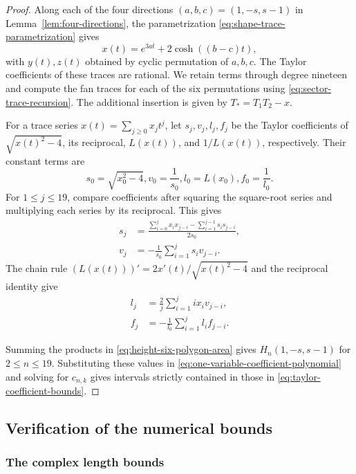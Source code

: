 \documentclass[10pt,twoside]{article}
\theoremstyle{plain}
\theoremstyle{definition}
\theoremstyle{remark}
\begin{document}
\begin{proof}
Along each of the four directions $(a,b,c)=(1,-s,s-1)$ in
Lemma~\ref{lem:four-directions}, the parametrization
\eqref{eq:shape-trace-parametrization} gives
$$
x(t)=e^{3at}+2\cosh((b-c)t),
$$
with $y(t),z(t)$ obtained by cyclic permutation of $a,b,c$.
The Taylor coefficients of these traces are rational. We retain
terms through degree nineteen and compute the fan traces for each
of the six permutations using \eqref{eq:sector-trace-recursion}.
The additional insertion is given by $T_*=T_1T_2-x$.

For a trace series $x(t)=\sum_{j\geq0}x_jt^j$, let
$s_j,v_j,l_j,f_j$ be the Taylor coefficients of
$\sqrt{x(t)^2-4}$, its reciprocal, $L(x(t))$, and
$1/L(x(t))$, respectively. Their constant terms are
$$
s_0=\sqrt{x_0^2-4},
v_0=\frac1{s_0},
l_0=L(x_0),
f_0=\frac1{l_0}.
$$
For $1\leq j\leq19$, compare coefficients after squaring the
square-root series and multiplying each series by its reciprocal.
This gives
\begin{equation*}
\begin{aligned}
s_j&=
\frac{\displaystyle\sum_{i=0}^jx_ix_{j-i}
-\displaystyle\sum_{i=1}^{j-1}s_is_{j-i}}{2s_0},\\
v_j&=-\frac1{s_0}\sum_{i=1}^js_iv_{j-i}.
\end{aligned}
\end{equation*}
The chain rule
$(L(x(t)))'=2x'(t)/\sqrt{x(t)^2-4}$ and the reciprocal
identity give
\begin{equation*}
\begin{aligned}
l_j&=\frac2j\sum_{i=1}^ji x_iv_{j-i},\\
f_j&=-\frac1{l_0}\sum_{i=1}^jl_if_{j-i}.
\end{aligned}
\end{equation*}

Summing the products in \eqref{eq:height-six-polygon-area}
gives $H_n(1,-s,s-1)$ for $2\leq n\leq19$.
Substituting these values in \eqref{eq:one-variable-coefficient-polynomial}
and solving for $c_{n,k}$ gives intervals strictly contained in those in
\eqref{eq:taylor-coefficient-bounds}.
\end{proof}

\subsection{Verification of the numerical bounds}
\label{app:numerical-checks}

\subsubsection{The complex length bounds}
\label{app:complex-length-checks}
\end{document}
